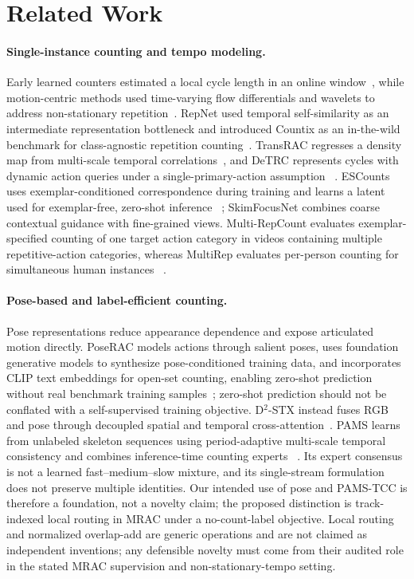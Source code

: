 \section{Related Work}
\label{sec:related_work}

\paragraph{Single-instance counting and tempo modeling.}
Early learned counters estimated a local cycle length in an online
window~\cite{levy2015live}, while motion-centric methods used time-varying
flow differentials and wavelets to address non-stationary
repetition~\cite{runia2018realworld}. RepNet used temporal self-similarity as an
intermediate representation bottleneck and introduced Countix as an in-the-wild
benchmark for class-agnostic repetition counting~\cite{dwibedi2020repnet}.
TransRAC regresses a density map from
multi-scale temporal correlations~\cite{hu2022transrac}, and DeTRC represents
cycles with dynamic action queries under a single-primary-action assumption
~\cite{ma2026detrc}. ESCounts uses exemplar-conditioned correspondence during
training and learns a latent used for exemplar-free, zero-shot inference
~\cite{sinha2024escounts}; SkimFocusNet combines
coarse contextual guidance with fine-grained views. Multi-RepCount evaluates
exemplar-specified counting of one target action category in videos containing
multiple repetitive-action categories, whereas MultiRep evaluates per-person
counting for simultaneous human instances
~\cite{zhao2025skimfocus,tang2024multicounter}.

\paragraph{Pose-based and label-efficient counting.}
Pose representations reduce appearance dependence and expose articulated
motion directly. PoseRAC models actions through salient poses, uses foundation
generative models to synthesize pose-conditioned training data, and
incorporates CLIP text embeddings for open-set counting, enabling zero-shot
prediction without real benchmark training samples~\cite{yao2025poserac};
zero-shot prediction should not be conflated with a self-supervised training
objective. D$^2$-STX instead fuses RGB and pose through
decoupled spatial and temporal cross-attention~\cite{wang2026d2stx}. PAMS
learns from unlabeled skeleton sequences using period-adaptive multi-scale
temporal consistency and combines inference-time counting experts
~\cite{gao2026pams}. Its expert consensus is not a learned fast--medium--slow
mixture, and its single-stream formulation does not preserve multiple
identities. Our intended use of pose and PAMS-TCC is therefore a foundation,
not a novelty claim; the proposed distinction is track-indexed local routing in
MRAC under a no-count-label objective. Local routing and normalized overlap-add
are generic operations and are not claimed as independent inventions; any
defensible novelty must come from their audited role in the stated MRAC
supervision and non-stationary-tempo setting.

